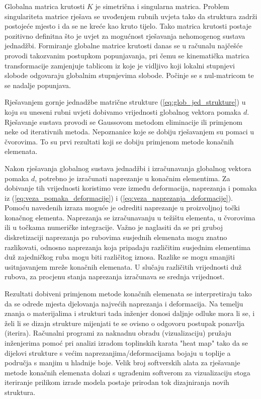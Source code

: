 \documentclass[a4paper,twoside,12pt]{memoir} %
\begin{document}
Globalna matrica krutosti $K$ je simetrična i singularna matrica. Problem singulariteta matrice rješava se uvođenjem rubnih uvjeta tako da struktura zadrži postojeće mjesto i da se ne kreće kao kruto tijelo. Tako matrica krutosti postaje pozitivno definitna što je uvjet za mogućnost rješavanja nehomogenog sustava jednadžbi.
Formiranje globalne matrice krutosti danas se u računalu najčešće provodi takozvanim postupkom popunjavanja, pri čemu se kinematička matrica transformacije zamjenjuje tablicom iz koje je vidljivo koji lokalni stupnjevi slobode odgovaraju globalnim stupnjevima slobode. Počinje se s nul-matricom te se nadalje popunjava. \par

Rješavanjem gornje jednadžbe matrične strukture (\ref{eq:glob_jed_strukture}) u koju su uneseni rubni uvjeti dobivamo vrijednosti globalnog vektora pomaka $d$. Rješavanje sustava provodi se Gaussovom metodom eliminacije ili primjenom neke od iterativnih metoda. Nepoznanice koje se dobiju rješavanjem su pomaci u čvorovima. To su prvi rezultati koji se dobiju primjenom metode konačnih elemenata. \par

Nakon rješavanja globalnog sustava jednadžbi i izračunavanja globalnog vektora pomaka $d$, potrebno je izračunati naprezanje u konačnim elementima. Za dobivanje tih vrijednosti koristimo veze između deformacija, naprezanja i pomaka iz (\ref{eq:veza_pomaka_deformacije}) i (\ref{eq:veza_naprezanja_deformacije}). Pomoću navedenih izraza moguće je odrediti naprezanje u proizvoljnoj točki konačnog elementa. Naprezanja se izračunavanju u težištu elementa, u čvorovima ili u točkama numeričke integracije. Važno je naglasiti da se pri gruboj diskretizaciji naprezanja po rubovima susjednih elemenata mogu znatno razlikovati, odnosno naprezanja koja pripadaju različitim susjednim elementima duž zajedničkog ruba mogu biti različitog iznosa. Razlike se mogu smanjiti usitnjavanjem mreže konačnih elemenata. U slučaju različitih vrijednosti duž rubova, za procjenu stanja naprezanja izračunava se srednja vrijednost. \par

Rezultati dobiveni primjenom metode konačnih elemenata se interpretiraju tako da se odrede mjesta djelovanja najvećih naprezanja i deformacija. Na temelju znanja o materijalima i strukturi tada inženjer donosi daljnje odluke mora li se, i želi li se dizajn strukture mijenjati te se ovisno o odgovoru postupak ponavlja (iterira). Računalni programi za naknadnu obradu (vizualizaciju) pružaju inženjerima pomoć pri analizi izradom toplinskih karata "heat map" tako da se dijelovi strukture s većim naprezanjima/deformacijama bojaju u toplije a područja s manjim u hladnije boje. Velik broj softverskih alata za rješavanje metode konačnih elemenata dolazi s ugrađenim softverom za vizualizaciju stoga iteriranje prilikom izrade modela postaje prirodan tok dizajniranja novih struktura.
\end{document}

